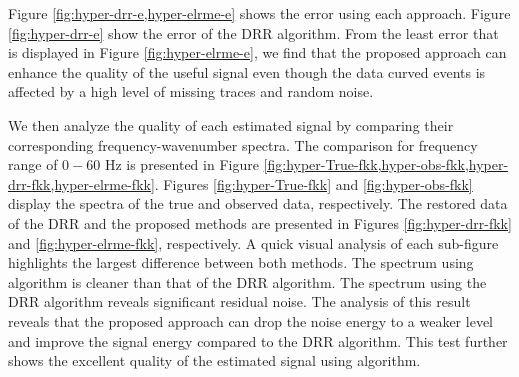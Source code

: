
Figure \ref{fig:hyper-drr-e,hyper-elrme-e} shows the  error using each approach. Figure \ref{fig:hyper-drr-e} show the  error of the DRR algorithm. From the least  error that is displayed in Figure \ref{fig:hyper-elrme-e}, we find that the proposed approach can enhance the quality of the useful signal even though the  data  curved events is affected by a high level of missing traces and random noise.  


We then analyze the quality of each estimated signal by comparing their corresponding frequency-wavenumber spectra. The comparison for frequency range of $0 - 60$ Hz is presented in Figure \ref{fig:hyper-True-fkk,hyper-obs-fkk,hyper-drr-fkk,hyper-elrme-fkk}. Figures \ref{fig:hyper-True-fkk} and \ref{fig:hyper-obs-fkk} display the spectra of the true and observed data, respectively. The restored data of the DRR and the proposed methods are presented in Figures \ref{fig:hyper-drr-fkk} and \ref{fig:hyper-elrme-fkk}, respectively. A quick visual analysis of each sub-figure highlights the largest difference between both methods. The spectrum using  algorithm is cleaner than that of the DRR algorithm. The spectrum using the DRR algorithm reveals significant residual noise. The analysis of this result reveals that the proposed approach can drop the noise energy to a weaker level and improve the signal energy compared to the DRR algorithm. This test further shows the excellent quality of the estimated signal using  algorithm.

